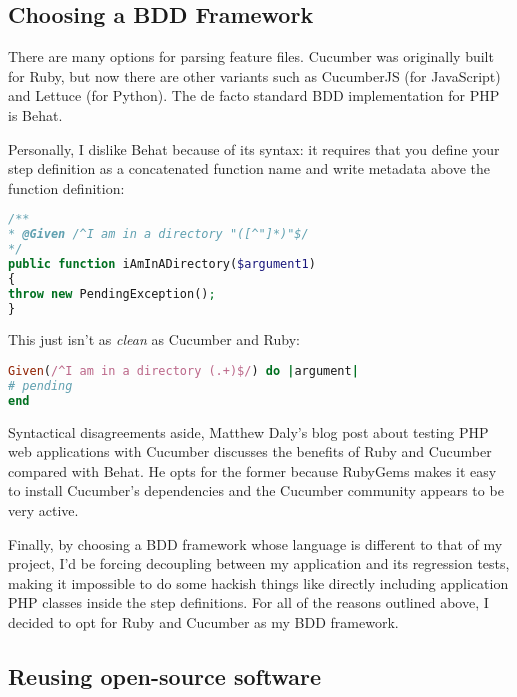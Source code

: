 \subsection{Choosing a BDD Framework}

There are many options for parsing feature files. Cucumber was originally built for Ruby, but now there are other variants such as CucumberJS (for JavaScript) and Lettuce (for Python). The de facto standard BDD implementation for PHP is Behat.

Personally, I dislike Behat because of its syntax: it requires that you define your step definition as a concatenated function name and write metadata above the function definition:

\begin{minipage}{\textwidth}
\begin{lstlisting}[language=php]
/**
* @Given /^I am in a directory "([^"]*)"$/
*/
public function iAmInADirectory($argument1)
{
throw new PendingException();
}
\end{lstlisting}
\end{minipage}

This just isn't as \emph{clean} as Cucumber and Ruby:

\begin{minipage}{\textwidth}
\begin{lstlisting}[language=ruby]
Given(/^I am in a directory (.+)$/) do |argument|
# pending
end
\end{lstlisting}
\end{minipage}

Syntactical disagreements aside, Matthew Daly's blog post about testing PHP web applications with Cucumber discusses the benefits of Ruby and Cucumber compared with Behat. He opts for the former because RubyGems makes it easy to install Cucumber's dependencies and the Cucumber community appears to be very active.~\cite{matthewDaly}

Finally, by choosing a BDD framework whose language is different to that of my project, I'd be forcing decoupling between my application and its regression tests, making it impossible to do some hackish things like directly including application PHP classes inside the step definitions. For all of the reasons outlined above, I decided to opt for Ruby and Cucumber as my BDD framework.

\subsection{Reusing open-source software}

